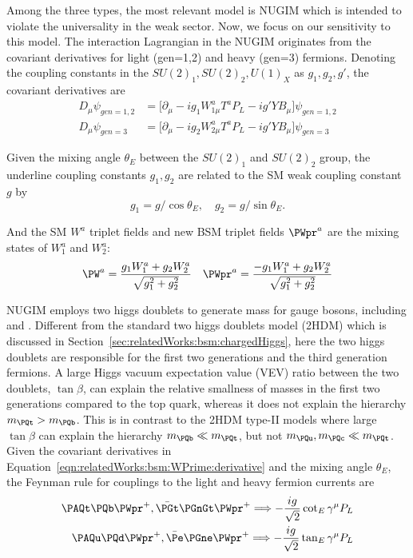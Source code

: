 Among the three types, the most relevant model is NUGIM which is intended to violate the universality in the weak sector. Now, we focus on our sensitivity to this model. The interaction Lagrangian in the NUGIM originates from the covariant derivatives for light (gen=1,2) and heavy (gen=3) fermions. Denoting the coupling constants in the $SU(2)_1 , SU(2)_2, U(1)_X$ as $g_1, g_2, g'$, the covariant derivatives are
\begin{equation}
\begin{split}
	D_\mu \psi_{gen=1,2} &= \big[ \partial_\mu -ig_1W^a_{1\mu} T^a P_L - ig'YB_\mu\big] \psi_{gen=1,2}  \\
    D_\mu \psi_{gen=3} &= \big[ \partial_\mu -ig_2W^a_{2\mu} T^a P_L - ig'YB_\mu\big] \psi_{gen=3} 
\end{split}
\label{eqn:relatedWorks:bsm:WPrime:derivative}
\end{equation}

\noindent Given the mixing angle $\theta_E$ between the $SU(2)_1$ and $SU(2)_2$ group, the underline coupling constants $g_1, g_2$ are related to the SM weak coupling constant $g$ by
\begin{equation}
	g_1=g/ \cos \theta_E, \quad g_2=g/ \sin \theta_E.
\end{equation}

\noindent And the SM $W^a$ triplet fields and new BSM triplet fields $\PWpr^a$  are the mixing states of $W_1^a$ and $W_2^a$:
\begin{equation}
	\PW^a = \frac{g_1 W^a_1 + g_2 W_2^a}{\sqrt{g_1^2+g_2^2}} \quad \PWpr^a = \frac{-g_1 W^a_1 + g_2 W_2^a}{\sqrt{g_1^2+g_2^2}}
\end{equation}

\noindent NUGIM employs two higgs doublets to generate mass for gauge bosons, including \PW and \PWpr. Different from the standard two higgs doublets model (2HDM) which is discussed in Section~\ref{sec:relatedWorks:bsm:chargedHiggs}, here the two higgs doublets are responsible for the first two generations and the third generation fermions. A large Higgs vacuum expectation value (VEV)  ratio between the two doublets, $\tan \beta$, can explain the relative smallness of masses in the first two generations compared to the top quark, whereas it does not explain the hierarchy $m_\PQt > m_\PQb$. This is in contrast to the 2HDM type-II models where large $\tan \beta$ can explain the hierarchy $m_\PQb\ll m_\PQt$, but not $m_\PQu, m_\PQc  \ll m_\PQt$. Given the covariant derivatives in Equation~\ref{eqn:relatedWorks:bsm:WPrime:derivative} and the mixing angle $\theta_E$, the Feynman rule for \PWpr couplings \cite{Edelhauser:2014yra} to the light and heavy fermion currents are 
\begin{equation}
\begin{split}
	\PAQt  \PQb \PWpr^+ , \bar{\PGt} \PGnGt \PWpr^+ \Longrightarrow -\frac{i g}{\sqrt{2}} \cot_E \gamma^\mu P_L \\
    \PAQu \PQd \PWpr^+ , \bar{\Pe} \PGne \PWpr^+ \Longrightarrow -\frac{i g}{\sqrt{2}} \tan_E \gamma^\mu P_L
\end{split}
\label{eqn:relatedWorks:bsm:WPrime:feynmanRule}
\end{equation}

